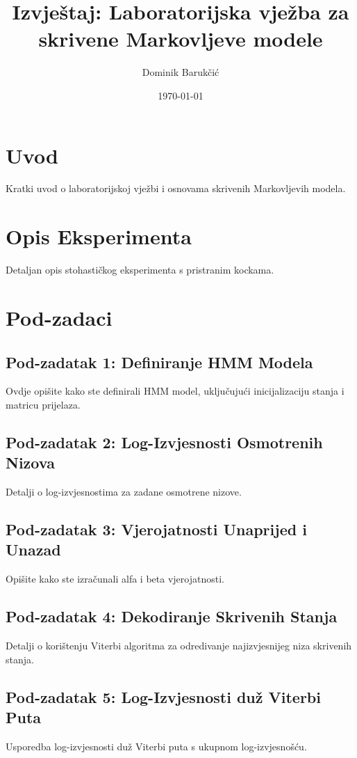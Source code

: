 \documentclass[12pt]{article}
\title{Izvještaj: Laboratorijska vježba za skrivene Markovljeve modele}
\author{Dominik Barukčić}
\date{\today}
\begin{document}
	
	\maketitle
	
	\section{Uvod}
	Kratki uvod o laboratorijskoj vježbi i osnovama skrivenih Markovljevih modela.
	
	\section{Opis Eksperimenta}
	Detaljan opis stohastičkog eksperimenta s pristranim kockama.
	
	\section{Pod-zadaci}
	\subsection{Pod-zadatak 1: Definiranje HMM Modela}
	Ovdje opišite kako ste definirali HMM model, uključujući inicijalizaciju stanja i matricu prijelaza.
	
	\subsection{Pod-zadatak 2: Log-Izvjesnosti Osmotrenih Nizova}
	Detalji o log-izvjesnostima za zadane osmotrene nizove.
	
	\subsection{Pod-zadatak 3: Vjerojatnosti Unaprijed i Unazad}
	Opišite kako ste izračunali alfa i beta vjerojatnosti.
	
	\subsection{Pod-zadatak 4: Dekodiranje Skrivenih Stanja}
	Detalji o korištenju Viterbi algoritma za odredivanje najizvjesnijeg niza skrivenih stanja.
	
	\subsection{Pod-zadatak 5: Log-Izvjesnosti duž Viterbi Puta}
	Usporedba log-izvjesnosti duž Viterbi puta s ukupnom log-izvjesnošću.
	
\end{document}
